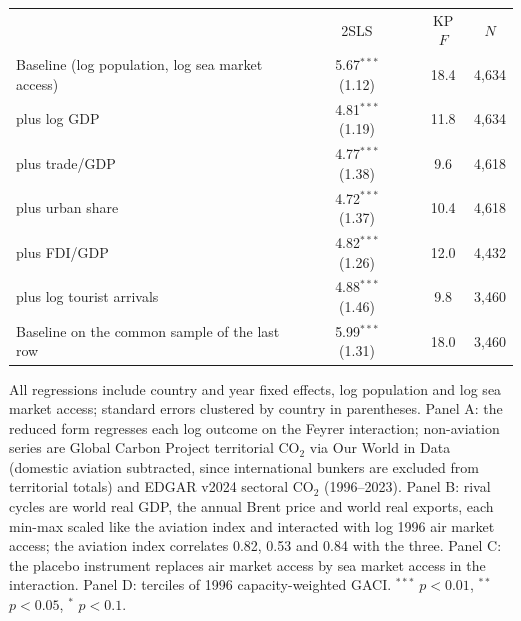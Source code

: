 \begin{table}[htbp]
\begin{threeparttable}
\begin{tabular}{lcccc}
 & 2SLS & & KP $F$ & $N$ \\
  Baseline (log population, log sea market access) & 5.67$^{***}$ (1.12) & & 18.4 & 4,634 \\
  \quad plus log GDP & 4.81$^{***}$ (1.19) & & 11.8 & 4,634 \\
  \quad plus trade/GDP & 4.77$^{***}$ (1.38) & & 9.6 & 4,618 \\
  \quad plus urban share & 4.72$^{***}$ (1.37) & & 10.4 & 4,618 \\
  \quad plus FDI/GDP & 4.82$^{***}$ (1.26) & & 12.0 & 4,432 \\
  \quad plus log tourist arrivals & 4.88$^{***}$ (1.46) & & 9.8 & 3,460 \\
  Baseline on the common sample of the last row & 5.99$^{***}$ (1.31) & & 18.0 & 3,460 \\
\bottomrule
\end{tabular}
\begin{tablenotes}\scriptsize
\item All regressions include country and year fixed effects, log population and log sea market access; standard errors clustered by country in parentheses. Panel A: the reduced form regresses each log outcome on the Feyrer interaction; non-aviation series are Global Carbon Project territorial CO$_2$ via Our World in Data (domestic aviation subtracted, since international bunkers are excluded from territorial totals) and EDGAR v2024 sectoral CO$_2$ (1996--2023). Panel B: rival cycles are world real GDP, the annual Brent price and world real exports, each min-max scaled like the aviation index and interacted with log 1996 air market access; the aviation index correlates 0.82, 0.53 and 0.84 with the three. Panel C: the placebo instrument replaces air market access by sea market access in the interaction. Panel D: terciles of 1996 capacity-weighted GACI. $^{***}$ $p<0.01$, $^{**}$ $p<0.05$, $^{*}$ $p<0.1$.
\end{tablenotes}
\end{threeparttable}
\end{table}

